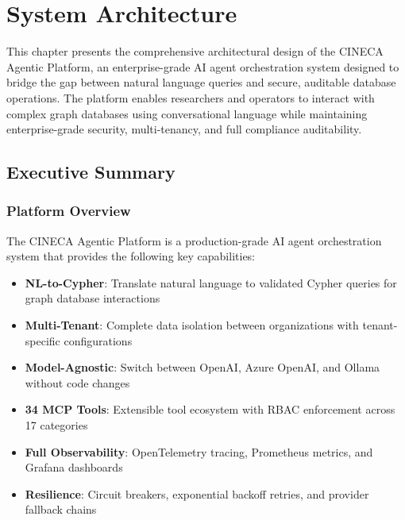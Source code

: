 \documentclass[a4paper,twoside]{sapthesis}
\begin{document}

\chapter{System Architecture}
\label{ch:architecture}

This chapter presents the comprehensive architectural design of the CINECA Agentic Platform, an enterprise-grade AI agent orchestration system designed to bridge the gap between natural language queries and secure, auditable database operations. The platform enables researchers and operators to interact with complex graph databases using conversational language while maintaining enterprise-grade security, multi-tenancy, and full compliance auditability.

\section{Executive Summary}
\label{sec:arch-executive-summary}

\subsection{Platform Overview}
\label{subsec:platform-overview}

The CINECA Agentic Platform is a production-grade AI agent orchestration system that provides the following key capabilities:

\begin{itemize}
    \item \textbf{NL-to-Cypher}: Translate natural language to validated Cypher queries for graph database interactions
    \item \textbf{Multi-Tenant}: Complete data isolation between organizations with tenant-specific configurations
    \item \textbf{Model-Agnostic}: Switch between OpenAI, Azure OpenAI, and Ollama without code changes
    \item \textbf{34 MCP Tools}: Extensible tool ecosystem with RBAC enforcement across 17 categories
    \item \textbf{Full Observability}: OpenTelemetry tracing, Prometheus metrics, and Grafana dashboards
    \item \textbf{Resilience}: Circuit breakers, exponential backoff retries, and provider fallback chains
\end{itemize}
\end{document}

